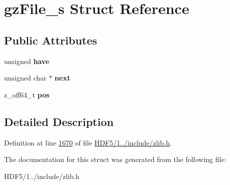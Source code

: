\hypertarget{structgz_file__s}{}\section{gz\+File\+\_\+s Struct Reference}
\label{structgz_file__s}
\subsection*{Public Attributes}
\begin{DoxyCompactItemize}
\item 
\mbox{\label{structgz_file__s_abb96e208e17a991c09b4df6cefcc1c04}} 
unsigned {\bfseries have}
\item 
\mbox{\label{structgz_file__s_aa5e3e3da0143cde8f92ddfd6996d55fc}} 
unsigned char $\ast$ {\bfseries next}
\item 
\mbox{\label{structgz_file__s_a98038b7edb4ab55ee321fa388afb687e}} 
z\+\_\+off64\+\_\+t {\bfseries pos}
\end{DoxyCompactItemize}


\subsection{Detailed Description}


Definition at line \hyperlink{_h_d_f5_21_810_81_2include_2zlib_8h_source_l01670}{1670} of file \hyperlink{_h_d_f5_21_810_81_2include_2zlib_8h_source}{H\+D\+F5/1../include/zlib.\+h}.



The documentation for this struct was generated from the following file\+:\begin{DoxyCompactItemize}
\item 
H\+D\+F5/1../include/zlib.\+h\end{DoxyCompactItemize}
